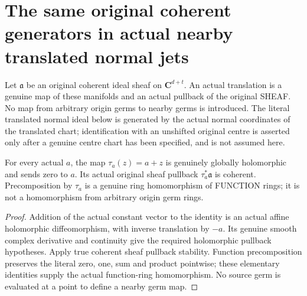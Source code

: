 \section{The same original coherent generators in actual nearby translated normal jets}
Let $\mathfrak a$ be an original coherent ideal sheaf on $\mathbf C^{d+t}$.
An actual translation is a genuine map of these manifolds and an actual
pullback of the original SHEAF. No map from arbitrary origin germs to nearby
germs is introduced. The literal translated normal ideal below is generated
by the actual normal coordinates of the translated chart; identification with
an unshifted original centre is asserted only after a genuine centre chart
has been specified, and is not assumed here.

\begin{lemma}
\label{hir:relative-normal-translated-jets-actual-affine-pullback}
\leanok
{}
For every actual $a$, the map $\tau_a(z)=a+z$ is genuinely globally holomorphic
and sends zero to $a$. Its actual original sheaf pullback $\tau_a^*\mathfrak a$
is coherent. Precomposition by $\tau_a$ is a genuine ring homomorphism of
FUNCTION rings; it is not a homomorphism from arbitrary origin germ rings.
\end{lemma}
\begin{proof}
Addition of the actual constant vector to the identity is an actual affine
holomorphic diffeomorphism, with inverse translation by $-a$. Its genuine
smooth complex derivative and continuity give the required holomorphic
pullback hypotheses. Apply true coherent sheaf pullback stability. Function
precomposition preserves the literal zero, one, sum and product pointwise;
these elementary identities supply the actual function-ring homomorphism.
No source germ is evaluated at a point to define a nearby germ map.
\end{proof}

